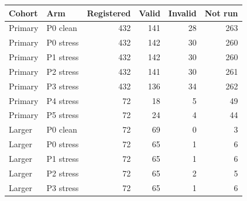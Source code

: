 \begin{tabular}{@{}llrrrr@{}}\toprule
Cohort & Arm & Registered & Valid & Invalid & Not run\\\midrule
Primary & P0 clean & 432 & 141 & 28 & 263\\
Primary & P0 stress & 432 & 142 & 30 & 260\\
Primary & P1 stress & 432 & 142 & 30 & 260\\
Primary & P2 stress & 432 & 141 & 30 & 261\\
Primary & P3 stress & 432 & 136 & 34 & 262\\
Primary & P4 stress & 72 & 18 & 5 & 49\\
Primary & P5 stress & 72 & 24 & 4 & 44\\
Larger & P0 clean & 72 & 69 & 0 & 3\\
Larger & P0 stress & 72 & 65 & 1 & 6\\
Larger & P1 stress & 72 & 65 & 1 & 6\\
Larger & P2 stress & 72 & 65 & 2 & 5\\
Larger & P3 stress & 72 & 65 & 1 & 6\\
\bottomrule
\end{tabular}
